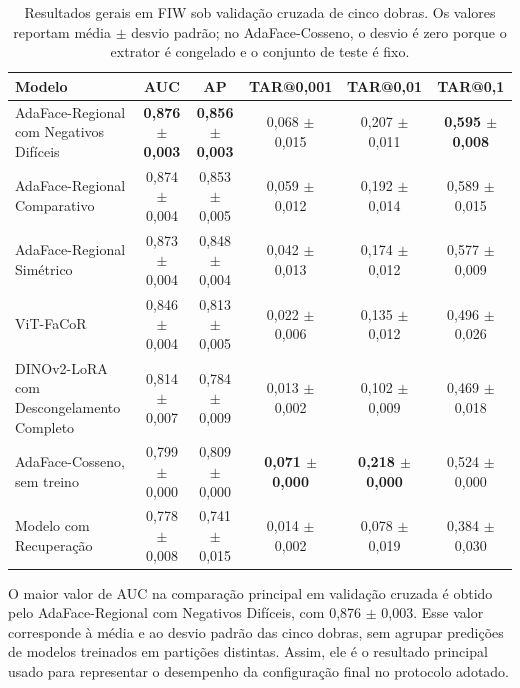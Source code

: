 \begin{table}[htbp]
\centering
\scriptsize
\setlength{\tabcolsep}{3pt}
\caption{Resultados gerais em FIW sob validação cruzada de cinco dobras. Os valores reportam média $\pm$ desvio padrão; no AdaFace-Cosseno, o desvio é zero porque o extrator é congelado e o conjunto de teste é fixo.}
\label{tab:fiw_main}
\begin{tabularx}{\textwidth}{Xccccc}
\hline
\textbf{Modelo} & \textbf{AUC} & \textbf{AP} & \textbf{TAR@0{,}001} & \textbf{TAR@0{,}01} & \textbf{TAR@0{,}1} \\
\hline
AdaFace-Regional com Negativos Difíceis & \textbf{0{,}876 $\pm$ 0{,}003} & \textbf{0{,}856 $\pm$ 0{,}003} & 0{,}068 $\pm$ 0{,}015 & 0{,}207 $\pm$ 0{,}011 & \textbf{0{,}595 $\pm$ 0{,}008} \\
AdaFace-Regional Comparativo & 0{,}874 $\pm$ 0{,}004 & 0{,}853 $\pm$ 0{,}005 & 0{,}059 $\pm$ 0{,}012 & 0{,}192 $\pm$ 0{,}014 & 0{,}589 $\pm$ 0{,}015 \\
AdaFace-Regional Simétrico & 0{,}873 $\pm$ 0{,}004 & 0{,}848 $\pm$ 0{,}004 & 0{,}042 $\pm$ 0{,}013 & 0{,}174 $\pm$ 0{,}012 & 0{,}577 $\pm$ 0{,}009 \\
ViT-FaCoR & 0{,}846 $\pm$ 0{,}004 & 0{,}813 $\pm$ 0{,}005 & 0{,}022 $\pm$ 0{,}006 & 0{,}135 $\pm$ 0{,}012 & 0{,}496 $\pm$ 0{,}026 \\
DINOv2-LoRA com Descongelamento Completo & 0{,}814 $\pm$ 0{,}007 & 0{,}784 $\pm$ 0{,}009 & 0{,}013 $\pm$ 0{,}002 & 0{,}102 $\pm$ 0{,}009 & 0{,}469 $\pm$ 0{,}018 \\
AdaFace-Cosseno, sem treino & 0{,}799 $\pm$ 0{,}000 & 0{,}809 $\pm$ 0{,}000 & \textbf{0{,}071 $\pm$ 0{,}000} & \textbf{0{,}218 $\pm$ 0{,}000} & 0{,}524 $\pm$ 0{,}000 \\
Modelo com Recuperação & 0{,}778 $\pm$ 0{,}008 & 0{,}741 $\pm$ 0{,}015 & 0{,}014 $\pm$ 0{,}002 & 0{,}078 $\pm$ 0{,}019 & 0{,}384 $\pm$ 0{,}030 \\
\hline
\end{tabularx}
\end{table}

O maior valor de AUC na comparação principal em validação cruzada é obtido pelo AdaFace-Regional com Negativos Difíceis, com 0,876 $\pm$ 0{,}003. Esse valor corresponde à média e ao desvio padrão das cinco dobras, sem agrupar predições de modelos treinados em partições distintas. Assim, ele é o resultado principal usado para representar o desempenho da configuração final no protocolo adotado.

